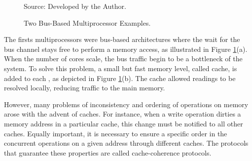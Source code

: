 			\begin{figure}[h]
				\centering
				\caption{Two Bus-Based \uma Multiprocessor Examples.}

				\qquad

				Source: Developed by the Author.

				\label{fig:uma}%
			\end{figure}

			The firsts \uma multiprocessors were bus-based architectures where
			the \cpu wait for the bus channel stays free to perform a memory
			access, as illustrated in Figure \ref{fig:uma}(a).
			When the number of cores scale, the bus traffic begin to be a
			bottleneck of the system.
			To solve this problem, a small but fast memory level, called cache,
			is added to each \cpu, as depicted in Figure \ref{fig:uma}(b).
			The cache allowed readings to be resolved locally, reducing traffic
			to the main memory.

			However, many problems of inconsistency and ordering of operations
			on memory arose with the advent of caches.
			For instance, when a write operation dirties a memory address in
			a particular cache, this change must be notified to all other caches.
			Equally important, it is necessary to ensure a specific order in
			the concurrent operations on a given address through different caches.
			The protocols that guarantee these properties are called cache-coherence protocols.

